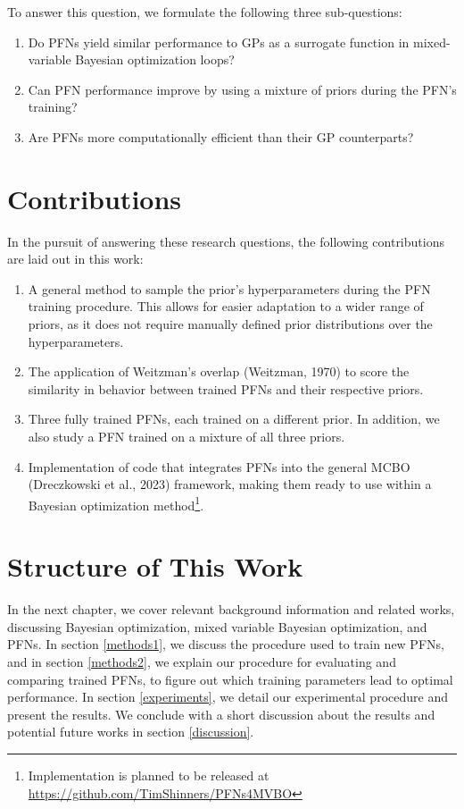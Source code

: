 \documentclass[12pt,twoside]{reedthesis}
\begin{document}
\vspace{\baselineskip}

To answer this question, we formulate the following three sub-questions:
\begin{enumerate}
\def\labelenumi{\arabic{enumi}.}
\item
  Do PFNs yield similar performance to GPs as a surrogate function in mixed-variable Bayesian optimization loops?
\item
  Can PFN performance improve by using a mixture of priors during the PFN's training?
\item
  Are PFNs more computationally efficient than their GP counterparts?
\end{enumerate}
\hypertarget{contributions}{%
\section{Contributions}\label{contributions}}

In the pursuit of answering these research questions, the following contributions are laid out in this work:
\begin{enumerate}
\def\labelenumi{\arabic{enumi}.}
\item
  A general method to sample the prior's hyperparameters during the PFN training procedure. This allows for easier adaptation to a wider range of priors, as it does not require manually defined prior distributions over the hyperparameters.
\item
  The application of Weitzman's overlap (Weitzman, 1970) to score the similarity in behavior between trained PFNs and their respective priors.
\item
  Three fully trained PFNs, each trained on a different prior. In addition, we also study a PFN trained on a mixture of all three priors.
\item
  Implementation of code that integrates PFNs into the general MCBO (Dreczkowski et al., 2023) framework, making them ready to use within a Bayesian optimization method\footnote{Implementation is planned to be released at \url{https://github.com/TimShinners/PFNs4MVBO}}.
\end{enumerate}
\hypertarget{structure-of-this-work}{%
\section{Structure of This Work}\label{structure-of-this-work}}

In the next chapter, we cover relevant background information and related works, discussing Bayesian optimization, mixed variable Bayesian optimization, and PFNs. In section \ref{methods1}, we discuss the procedure used to train new PFNs, and in section \ref{methods2}, we explain our procedure for evaluating and comparing trained PFNs, to figure out which training parameters lead to optimal performance. In section \ref{experiments}, we detail our experimental procedure and present the results. We conclude with a short discussion about the results and potential future works in section \ref{discussion}.
\end{document}

